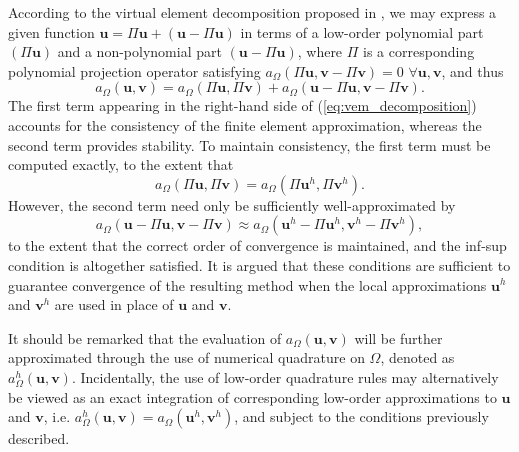 	According to the virtual element decomposition proposed in \cite{Veiga:13}, we may express a given function $\mathbf{u} = \Pi \mathbf{u} + (\mathbf{u} - \Pi \mathbf{u})$ in terms of a low-order polynomial part $(\Pi \mathbf{u})$ and a non-polynomial part $(\mathbf{u} - \Pi \mathbf{u})$, where $\Pi$ is a corresponding polynomial projection operator satisfying $a_{\Omega}(\Pi \mathbf{u},\mathbf{v} - \Pi \mathbf{v}) = 0 \, \, \forall \mathbf{u}, \mathbf{v}$, and thus
	\begin{equation}
		a_{\Omega}(\mathbf{u},\mathbf{v}) = a_{\Omega}(\Pi \mathbf{u},\Pi \mathbf{v}) + a_{\Omega}(\mathbf{u} - \Pi \mathbf{u},\mathbf{v} - \Pi \mathbf{v}).
		\label{eq:vem_decomposition}
	\end{equation}
	The first term appearing in the right-hand side of (\ref{eq:vem_decomposition}) accounts for the consistency of the finite element approximation, whereas the second term provides stability. To maintain consistency, the first term must be computed exactly, to the extent that
	\begin{equation}
		a_{\Omega}(\Pi \mathbf{u},\Pi \mathbf{v}) = a_{\Omega}(\Pi \mathbf{u}^h,\Pi \mathbf{v}^h).
	\end{equation}	
	However, the second term need only be sufficiently well-approximated by
	\begin{equation}
		a_{\Omega}(\mathbf{u} - \Pi \mathbf{u},\mathbf{v} - \Pi \mathbf{v}) \approx a_{\Omega}(\mathbf{u}^h - \Pi \mathbf{u}^h,\mathbf{v}^h - \Pi \mathbf{v}^h),
	\end{equation}
	to the extent that the correct order of convergence is maintained, and the inf-sup condition is altogether satisfied. It is argued that these conditions are sufficient to guarantee convergence of the resulting method when the local approximations $\mathbf{u}^h$ and $\mathbf{v}^h$ are used in place of $\mathbf{u}$ and $\mathbf{v}$.
	
	It should be remarked that the evaluation of $a_{\Omega}(\mathbf{u},\mathbf{v})$ will be further approximated through the use of numerical quadrature on $\Omega$, denoted as $a^h_{\Omega}(\mathbf{u},\mathbf{v})$. Incidentally, the use of low-order quadrature rules may alternatively be viewed as an exact integration of corresponding low-order approximations to $\mathbf{u}$ and $\mathbf{v}$, i.e. $a^h_{\Omega}(\mathbf{u},\mathbf{v}) = a_{\Omega}(\mathbf{u}^h,\mathbf{v}^h)$, and subject to the conditions previously described.
	
